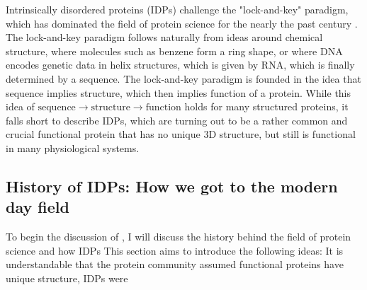 \documentclass{article}
\begin{document}
Intrinsically disordered proteins (IDPs) challenge the "lock-and-key" paradigm, which has dominated the field of protein science for the nearly the past century \cite{fischer_einfluss_1894}. The lock-and-key paradigm follows naturally from ideas around chemical structure, where molecules such as benzene form a ring shape, or where DNA encodes genetic data in helix structures, which is given by RNA, which is finally determined by a sequence. The lock-and-key paradigm is founded in the idea that sequence implies structure, which then implies function of a protein. While this idea of $\text{sequence} \rightarrow \text{structure} \rightarrow \text{function}$ holds for many structured proteins, it falls short to describe IDPs, which are turning out to be a rather common and crucial functional protein that has no unique 3D structure, but still is functional in many physiological systems. %

\subsection{History of IDPs: How we got to the modern day field}

To begin the discussion of , I will discuss the history behind the field of protein science and how IDPs  This section aims to introduce the following ideas: It is understandable that the protein community assumed functional proteins have unique structure, IDPs were 
\end{document}
